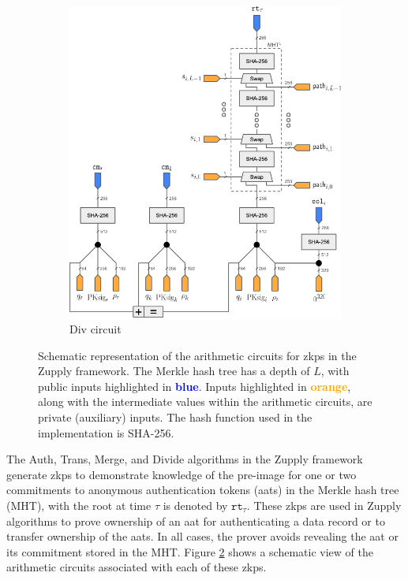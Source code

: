 \begin{figure}
\begin{subfigure}[t]{0.35\textwidth}
    \end{subfigure}
    \hfill
    \begin{subfigure}[t]{0.60\textwidth}  %
        \centering
        \includegraphics[scale=0.6]{Figures/Div.pdf} %
        \caption{\textsf{Div} circuit}
        \label{fig:Divcircuits}
        
    \end{subfigure}
    
   \caption[Zupply arithmetic circuits]{Schematic representation of the arithmetic circuits for \gls{zkp}s in the Zupply framework. The Merkle hash tree has a depth of $L$, with public inputs highlighted in \textcolor{blue}{\textbf{blue}}. Inputs highlighted in \textcolor{orange}{\textbf{orange}}, along with the intermediate values within the arithmetic circuits, are private (auxiliary) inputs. The hash function used in the implementation is SHA-256.}
    \label{fig:circuits}
\end{figure}


The \textsf{Auth}, \textsf{Trans}, \textsf{Merge}, and \textsf{Divide} algorithms in the Zupply framework generate \gls{zkp}s to demonstrate knowledge of the pre-image for one or two commitments to anonymous authentication tokens (\gls{aat}s) in the Merkle hash tree (\textsf{MHT}), with the root at time $\tau$ is denoted by $\texttt{rt}_\tau$. These \gls{zkp}s are used in Zupply algorithms to prove ownership of an \gls{aat} for authenticating a data record or to transfer ownership of the \gls{aat}s. In all cases, the prover avoids revealing the \gls{aat} or its commitment stored in the \textsf{MHT}. Figure \ref{fig:circuits} shows a schematic view of the arithmetic circuits associated with each of these \gls{zkp}s.


